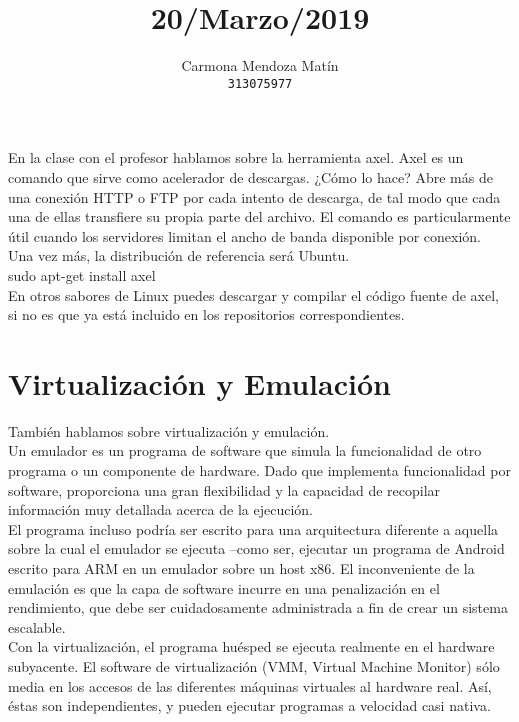 \documentclass[11pt, a4paper]{report}
\begin{document}
\title{20/Marzo/2019}
\author{
  Carmona Mendoza Mat\'in\\
  \texttt{313075977}
}
\date{}
\maketitle

En la clase con el profesor hablamos sobre la herramienta axel. Axel es un
comando que sirve como acelerador de descargas. ¿Cómo lo hace? Abre más de una
conexión HTTP o FTP por cada intento de descarga, de tal modo que cada una de
ellas transfiere su propia parte del archivo. El comando es particularmente
útil cuando los servidores limitan el ancho de banda disponible por conexión. \\

Una vez más, la distribución de referencia será Ubuntu. \\

sudo apt-get install axel \\

En otros sabores de Linux puedes descargar y compilar el código fuente de axel,
si no es que ya está incluido en los repositorios correspondientes. \\

\section*{Virtualización y Emulación}

También hablamos sobre virtualización y emulación. \\

Un emulador es un programa de software que simula la funcionalidad de otro
programa o un componente de hardware. Dado que implementa funcionalidad por
software, proporciona una gran flexibilidad y la capacidad de recopilar
información muy detallada acerca de la ejecución. \\

El programa incluso podría ser escrito para una arquitectura diferente a
aquella sobre la cual el emulador se ejecuta –como ser, ejecutar un programa de
Android escrito para ARM en un emulador sobre un host x86. El inconveniente de
la emulación es que la capa de software incurre en una penalización en el
rendimiento, que debe ser cuidadosamente administrada a fin de crear un sistema
escalable. \\

Con la virtualización, el programa huésped se ejecuta realmente en el hardware
subyacente. El software de virtualización (VMM, Virtual Machine Monitor) sólo
media en los accesos de las diferentes máquinas virtuales al hardware real.
Así, éstas son independientes, y pueden ejecutar programas a velocidad casi
nativa. \\
\end{document}
